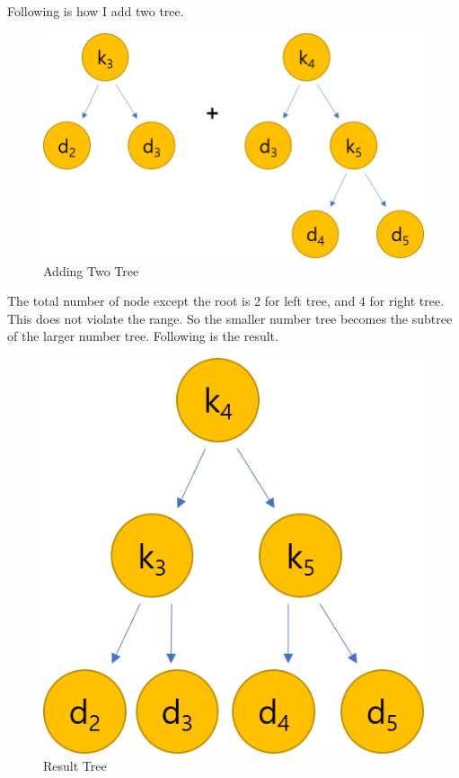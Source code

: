 \documentclass[a4paper,11pt]{article}
\begin{document}
\begin{enumerate}
Following is how I add two tree.
\begin{figure}[hbt]
	\centering
	\includegraphics[scale=0.4]{figure3.png}
	\caption{Adding Two Tree}
\end{figure}

The total number of node except the root is 2 for left tree, and 4 for right tree. This does not violate the range. So the smaller number tree becomes the subtree of the larger number tree. Following is the result.

\begin{figure}[hbt]
	\centering
	\includegraphics[scale=0.4]{figure4.png}
	\caption{Result Tree}
\end{figure}

\end{enumerate}
\end{document}
